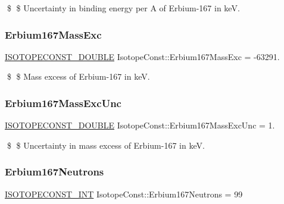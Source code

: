 \$ \$ Uncertainty in binding energy per A of Erbium-\/167 in keV. \mbox{\label{group___isotope_const-_erbium-_er167_ga5737393d066883bccd3d942c6fd74079}} 
\subsubsection{\texorpdfstring{Erbium167\+Mass\+Exc}{Erbium167MassExc}}
{\footnotesize\ttfamily \mbox{\hyperlink{group___isotope_const-_macros_ga8f45a7272ce02c0b4c65c44636ed719a}{I\+S\+O\+T\+O\+P\+E\+C\+O\+N\+S\+T\+\_\+\+D\+O\+U\+B\+LE}} Isotope\+Const\+::\+Erbium167\+Mass\+Exc = -\/63291.}

\$ \$ Mass excess of Erbium-\/167 in keV. \mbox{\label{group___isotope_const-_erbium-_er167_ga82d97e20d7bcdc7f63c4ae5cf6fef3f4}} 
\subsubsection{\texorpdfstring{Erbium167\+Mass\+Exc\+Unc}{Erbium167MassExcUnc}}
{\footnotesize\ttfamily \mbox{\hyperlink{group___isotope_const-_macros_ga8f45a7272ce02c0b4c65c44636ed719a}{I\+S\+O\+T\+O\+P\+E\+C\+O\+N\+S\+T\+\_\+\+D\+O\+U\+B\+LE}} Isotope\+Const\+::\+Erbium167\+Mass\+Exc\+Unc = 1.}

\$ \$ Uncertainty in mass excess of Erbium-\/167 in keV. \mbox{\label{group___isotope_const-_erbium-_er167_ga7f69b0fb4a9c2b5981690983fe2240ef}} 
\subsubsection{\texorpdfstring{Erbium167\+Neutrons}{Erbium167Neutrons}}
{\footnotesize\ttfamily \mbox{\hyperlink{group___isotope_const-_macros_ga5f18360b3e99483a35c32d789e62621c}{I\+S\+O\+T\+O\+P\+E\+C\+O\+N\+S\+T\+\_\+\+I\+NT}} Isotope\+Const\+::\+Erbium167\+Neutrons = 99}

